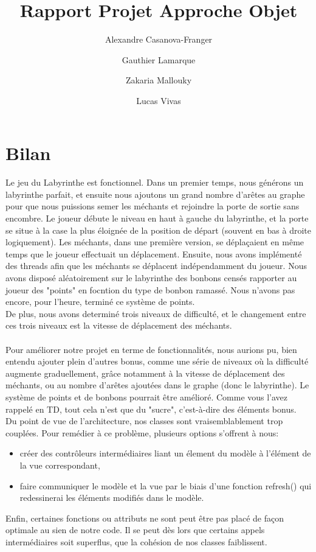 \documentclass{article}
\title{Rapport Projet Approche Objet}
\author{Alexandre Casanova-Franger\\
        \and
        Gauthier Lamarque\\
        \and
        Zakaria Mallouky\\
        \and
        Lucas Vivas\\
        }
\begin{document}
  \maketitle
  \section{Bilan}
  \paragraph{}
  Le jeu du Labyrinthe est fonctionnel. Dans un premier temps, nous générons un
  labyrinthe parfait, et ensuite nous ajoutons un grand nombre d'arêtes au
  graphe pour que nous puissions semer les méchants et rejoindre la porte de
  sortie sans encombre. Le joueur débute le niveau en haut à gauche du
  labyrinthe, et la porte se situe à la case la plus éloignée de la position de
  départ (souvent en bas à droite logiquement). Les méchants, dans une première
  version, se déplaçaient en même temps que le joueur effectuait un déplacement.
  Ensuite, nous avons implémenté des threads afin que les méchants se déplacent
  indépendamment du joueur. Nous avons disposé aléatoirement sur le labyrinthe
  des bonbons censés rapporter au joueur des "points" en focntion du type de
  bonbon ramassé. Nous n'avons pas encore, pour l'heure, terminé ce système de
  points.\\
  De plus, nous avons determiné trois niveaux de difficulté, et le changement
  entre ces trois niveaux est la vitesse de déplacement des méchants.

  \paragraph{}
  Pour améliorer notre projet en terme de fonctionnalités, nous aurions pu, bien
  entendu ajouter plein d'autres bonus, comme une série de niveaux où la
  difficulté augmente graduellement, grâce notamment à la vitesse de déplacement
  des méchants, ou au nombre d'arêtes ajoutées dans le graphe (donc le
  labyrinthe). Le système de points et de bonbons pourrait être amélioré. Comme
  vous l'avez rappelé en TD, tout cela n'est que du "sucre", c'est-à-dire des
  éléments bonus.\\
  Du point de vue de l'architecture, nos classes sont vraisemblablement trop
  couplées. Pour remédier à ce problème, plusieurs options s'offrent à nous:
  \begin{itemize}
    \item créer des contrôleurs intermédiaires liant un élement du modèle à
    l'élément de la vue correspondant,
    \item faire communiquer le modèle et la vue par le biais d'une fonction
    refresh() qui redessinerai les éléments modifiés dans le modèle.
  \end{itemize}
  Enfin, certaines fonctions ou attributs ne sont peut être pas placé de façon
  optimale au sien de notre code. Il se peut dès lors que certains appels
  intermédiaires soit superflus, que la cohésion de nos classes faiblissent.
\end{document}
